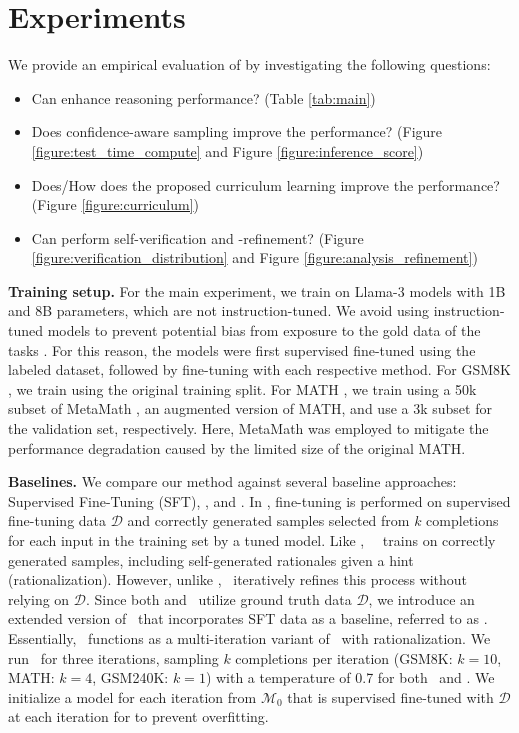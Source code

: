 \section{Experiments}
\label{sec:experiments}

We provide an empirical evaluation of \sname by investigating the following questions:
\begin{itemize}[leftmargin=*,topsep=0.0pt,itemsep=.5pt]
\item Can \sname enhance reasoning performance? (Table \ref{tab:main})
\item Does confidence-aware sampling improve the performance? (Figure \ref{figure:test_time_compute} and Figure \ref{figure:inference_score})
\item Does/How does the proposed curriculum learning improve the performance? (Figure \ref{figure:curriculum})
\item Can \sname perform self-verification and -refinement? (Figure \ref{figure:verification_distribution} and Figure \ref{figure:analysis_refinement}) 
\end{itemize}

\textbf{Training setup.}
For the main experiment, we train \sname on Llama-3 models with 1B and 8B parameters, which are not instruction-tuned. We avoid using instruction-tuned models to prevent potential bias from exposure to the gold data of the tasks \citep{wang2024scpo}. For this reason, the models were first supervised fine-tuned using the labeled dataset, followed by fine-tuning with each respective method. For GSM8K \citep{cobbe2021gsm8k}, we train \sname using the original training split. For MATH \citep{hendrycks2021math}, we train \sname using a 50k subset of MetaMath \citep{yu2024metamath}, an augmented version of MATH, and use a 3k subset for the validation set, respectively. Here, MetaMath was employed to mitigate the performance degradation caused by the limited size of the original MATH.

\textbf{Baselines.} We compare our method against several baseline approaches: Supervised Fine-Tuning (SFT), \baserft \citep{yuan2023scaling}, and \basestarplus. In \baserft, fine-tuning is performed on supervised fine-tuning data $\mathcal{D}$ and correctly generated samples selected from $k$ completions for each input in the training set by a tuned model. Like \baserft,~\basestar~\citep{zelikman2022star} trains on correctly generated samples, including self-generated rationales given a hint (rationalization). However, unlike \baserft, \basestar~iteratively refines this process without relying on $\mathcal{D}$. Since both \sname and \baserft~utilize ground truth data $\mathcal{D}$, we introduce an extended version of \basestar~that incorporates SFT data as a baseline, referred to as \basestarplus. Essentially, \basestarplus~functions as a multi-iteration variant of \baserft~with rationalization. We run \basestarplus~for three iterations, sampling $k$ completions per iteration (GSM8K: $k=10$, MATH: $k=4$, GSM240K: $k=1$) with a temperature of 0.7 for both \baserft~and \basestarplus. We initialize a model for each iteration from $\mathcal{M}_{0}$ that is supervised fine-tuned with $\mathcal{D}$ at each iteration for \basestarplus to prevent overfitting.

